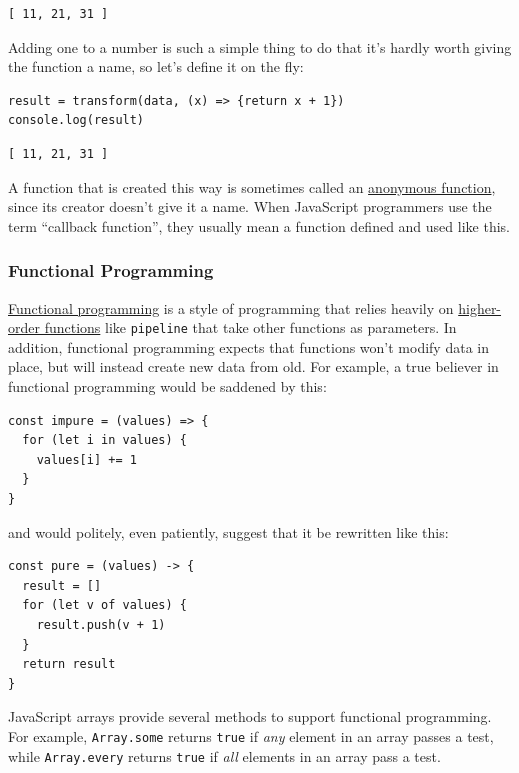 \begin{verbatim}
[ 11, 21, 31 ]
\end{verbatim}

Adding one to a number is such a simple thing to do that it's hardly
worth giving the function a name, so let's define it on the fly:

\begin{verbatim}
result = transform(data, (x) => {return x + 1})
console.log(result)
\end{verbatim}

\begin{verbatim}
[ 11, 21, 31 ]
\end{verbatim}

A function that is created this way is sometimes called an
\protect\hyperlink{g:anonymous-function}{anonymous function}, since its
creator doesn't give it a name. When JavaScript programmers use the term
``callback function'', they usually mean a function defined and used
like this.

\subsubsection{Functional Programming}\label{s:callbacks-functional}

\protect\hyperlink{g:functional-programming}{Functional programming} is
a style of programming that relies heavily on
\protect\hyperlink{g:higher-order-function}{higher-order functions} like
\texttt{pipeline} that take other functions as parameters. In addition,
functional programming expects that functions won't modify data in
place, but will instead create new data from old. For example, a true
believer in functional programming would be saddened by this:

\begin{verbatim}
const impure = (values) => {
  for (let i in values) {
    values[i] += 1
  }
}
\end{verbatim}

and would politely, even patiently, suggest that it be rewritten like
this:

\begin{verbatim}
const pure = (values) -> {
  result = []
  for (let v of values) {
    result.push(v + 1)
  }
  return result
}
\end{verbatim}

JavaScript arrays provide several methods to support functional
programming. For example, \texttt{Array.some} returns \texttt{true} if
\emph{any} element in an array passes a test, while \texttt{Array.every}
returns \texttt{true} if \emph{all} elements in an array pass a test.

